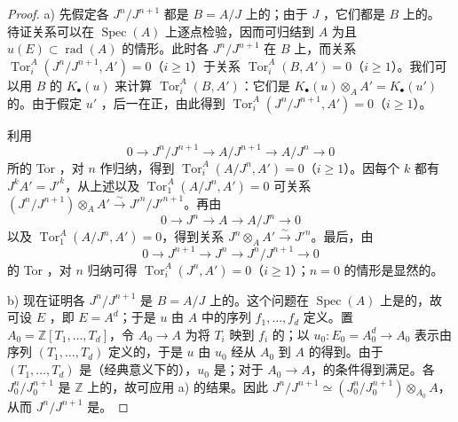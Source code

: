 \begin{proof}
a) 先假定各 $J^n/J^{n+1}$ 都是 $B=A/J$ 上的；由于 $J$ ，它们都是 $B$ 上的。
待证关系可以在 $\operatorname{Spec}(A)$ 上逐点检验，因而可归结到 $A$ 为且 $u(E)\subset\operatorname{rad}(A)$ 的情形。此时各 $J^n/J^{n+1}$ 在 $B$ 上，而关系 $\operatorname{Tor}_i^A(J^n/J^{n+1},A')=0$（$i\geq1$）于关系 $\operatorname{Tor}_i^A(B,A')=0$（$i\geq1$）。我们可以用 $B$ 的 $K_\bullet(u)$ 来计算 $\operatorname{Tor}_i^A(B,A')$：它们是 $K_\bullet(u)\otimes_A A'=K_\bullet(u')$ 的。由于假定 $u'$ ，后一在正，由此得到 $\operatorname{Tor}_i^A(J^n/J^{n+1},A')=0$（$i\geq1$）。

利用
\[
0\longrightarrow J^n/J^{n+1}\longrightarrow A/J^{n+1}\longrightarrow A/J^n\longrightarrow0
\]
所的 Tor ，对 $n$ 作归纳，得到 $\operatorname{Tor}_i^A(A/J^n,A')=0$（$i\geq1$）。因每个 $k$ 都有 $J^kA'=J'^k$，从上述以及 $\operatorname{Tor}_1^A(A/J^n,A')=0$ 可关系 $(J^n/J^{n+1})\otimes_A A'\xrightarrow{\sim}J'^n/J'^{n+1}$。再由
\[
0\longrightarrow J^n\longrightarrow A\longrightarrow A/J^n\longrightarrow0
\]
以及 $\operatorname{Tor}_1^A(A/J^n,A')=0$，得到关系 $J^n\otimes_A A'\xrightarrow{\sim}J'^n$。最后，由
\[
0\longrightarrow J^{n+1}\longrightarrow J^n\longrightarrow J^n/J^{n+1}\longrightarrow0
\]
的 Tor ，对 $n$ 归纳可得 $\operatorname{Tor}_i^A(J^n,A')=0$（$i\geq1$）；$n=0$ 的情形是显然的。

b) 现在证明各 $J^n/J^{n+1}$ 是 $B=A/J$ 上的。这个问题在 $\operatorname{Spec}(A)$ 上是的，故可设 $E$ ，即 $E=A^d$；于是 $u$ 由 $A$ 中的序列 $f_1,\ldots,f_d$ 定义。置 $A_0=\mathbb Z[T_1,\ldots,T_d]$，令 $A_0\to A$ 为将
$T_i$ 映到 $f_i$ 的；以 $u_0:E_0=A_0^d\to A_0$ 表示由序列 $(T_1,\ldots,T_d)$ 定义的，于是 $u$ 由 $u_0$ 经从 $A_0$ 到 $A$ 的得到。由于 $(T_1,\ldots,T_d)$ 是（经典意义下的），$u_0$ 是；对于 $A_0\to A$，的条件得到满足。各 $J_0^n/J_0^{n+1}$ 是 $\mathbb Z$ 上的，故可应用 a) 的结果。因此 $J^n/J^{n+1}\simeq(J_0^n/J_0^{n+1})\otimes_{A_0}A$，从而 $J^n/J^{n+1}$ 是。
\end{proof}

